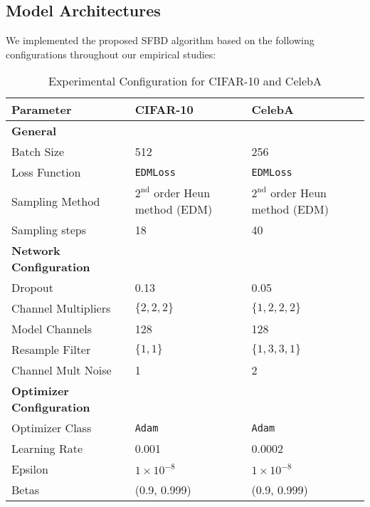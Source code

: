 \subsection{Model Architectures}
We implemented the proposed SFBD algorithm based on the following configurations throughout our empirical studies:
\begin{table}[h]
    \centering
    \caption{Experimental Configuration for CIFAR-10 and CelebA}
    \label{tab:experiment-config}
    \renewcommand{\arraystretch}{1.2} %
    \setlength{\tabcolsep}{6pt} %
    \begin{tabular}{p{4cm} p{4.5cm} p{4.5cm}} 
        \toprule
        \textbf{Parameter} & \textbf{CIFAR-10} & \textbf{CelebA} \\
        \midrule
        \textbf{General} & & \\
        Batch Size & 512 & 256 \\
        Loss Function & \texttt{EDMLoss} \citep{KarrasAAL22} & \texttt{EDMLoss} \citep{KarrasAAL22} \\
        Sampling Method &  $2^\text{nd}$ order Heun method (EDM) \citep{KarrasAAL22} & $2^\text{nd}$ order Heun method (EDM) \citep{KarrasAAL22}  \\
        Sampling steps & 18 & 40 \\
        \midrule 
        \textbf{Network Configuration} & & \\
        Dropout & 0.13 & 0.05 \\
        Channel Multipliers & $\{2, 2, 2\}$ & $\{1, 2, 2, 2\}$ \\
        Model Channels & 128 & 128 \\
        Resample Filter & $\{1, 1\}$ & $\{1, 3, 3, 1\}$ \\
        Channel Mult Noise & 1 & 2 \\
        \midrule
        \textbf{Optimizer Configuration} & & \\
        Optimizer Class & \texttt{Adam} \citep{KingmaBa2014} & \texttt{Adam}  \citep{KingmaBa2014} \\
        Learning Rate & 0.001 & 0.0002 \\
        Epsilon & $1 \times 10^{-8}$ & $1 \times 10^{-8}$ \\
        Betas & (0.9, 0.999) & (0.9, 0.999) \\
        \bottomrule
  \end{tabular}
\end{table}


